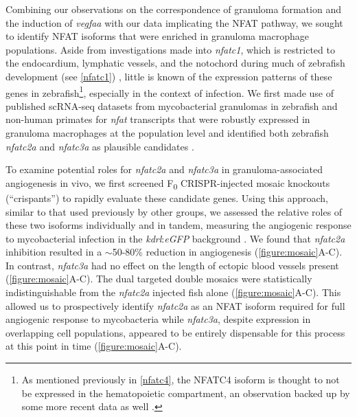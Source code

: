 Combining our observations on the correspondence of granuloma formation and the induction of \textit{vegfaa} with our data implicating the NFAT pathway, we sought to identify NFAT isoforms that were enriched in granuloma macrophage populations. Aside from investigations made into \textit{nfatc1}, which is restricted to the endocardium, lymphatic vessels, and the notochord during much of zebrafish development (see \autoref{nfatc1}) \citep{Pestel2016, Shin2019, Bagwell2020}, little is known of the expression patterns of these genes in zebrafish\footnote{As mentioned previously in \autoref{nfatc4}, the NFATC4 isoform is thought to not be expressed in the hematopoietic compartment, an observation backed up by some more recent data as well \citep{Peuker2022}.}, especially in the context of infection. We first made use of published scRNA-seq datasets from mycobacterial granulomas in zebrafish and non-human primates for \textit{nfat} transcripts that were robustly expressed in granuloma macrophages at the population level and identified both zebrafish \textit{nfatc2a} and \textit{nfatc3a} as plausible candidates \citep{Cronan2021, Gideon2022}.

To examine potential roles for \textit{nfatc2a} and \textit{nfatc3a} in granuloma-associated angiogenesis in vivo, we first screened F\textsubscript{0} CRISPR-injected mosaic knockouts (``crispants'') to rapidly evaluate these candidate genes. Using this approach, similar to that used previously by other groups, we assessed the relative roles of these two isoforms individually and in tandem, measuring the angiogenic response to mycobacterial infection in the \textit{kdrl}:\textit{eGFP} background \citep{Jao2013, Hoshijima2016, Wu2018, Hoshijima2019, Kroll2021}. We found that \textit{nfatc2a} inhibition resulted in a $\sim$50-80\% reduction in angiogenesis (\autoref{figure:mosaic}A-C). In contrast, \textit{nfatc3a} had no effect on the length of ectopic blood vessels present (\autoref{figure:mosaic}A-C). The dual targeted double mosaics were statistically indistinguishable from the \textit{nfatc2a} injected fish alone (\autoref{figure:mosaic}A-C). This allowed us to prospectively identify \textit{nfatc2a} as an NFAT isoform required for full angiogenic response to mycobacteria while \textit{nfatc3a}, despite expression in overlapping cell populations, appeared to be entirely dispensable for this process at this point in time (\autoref{figure:mosaic}A-C). 

